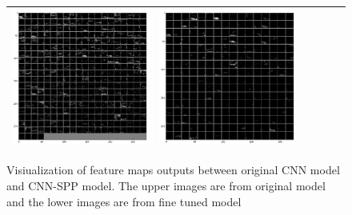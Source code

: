 \begin{figure}[!htb]
\begin{center}
\begin{tabular}{|c|c|c|c|c|c|}
\includegraphics[scale=0.1]{sunny2_conv4_fm.png} &
\includegraphics[scale=0.1]{sunny2_conv5_fm.png}\\ \hline\hline
\end{tabular}

\end{center}
	\caption{Visiualization of feature maps outputs between original CNN model and CNN-SPP model. The upper images are from original model and the lower images are from fine tuned model}
	\label{fig:diff_featuremap}%
\end{figure}

